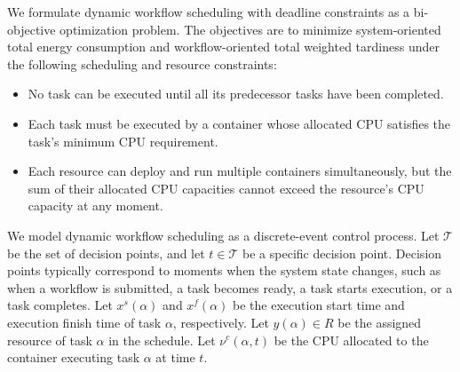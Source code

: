 \documentclass[10pt,journal]{IEEEtran}
\begin{document}
We formulate dynamic workflow scheduling with deadline constraints as a bi-objective optimization problem. The objectives are to minimize system-oriented total energy consumption and workflow-oriented total weighted tardiness under the following scheduling and resource constraints:
\begin{itemize}
    \item No task can be executed until all its predecessor tasks have been completed.
    \item Each task must be executed by a container whose allocated CPU satisfies the task's minimum CPU requirement.
    \item Each resource can deploy and run multiple containers simultaneously, but the sum of their allocated CPU capacities cannot exceed the resource's CPU capacity at any moment.
\end{itemize}

We model dynamic workflow scheduling as a discrete-event control process. Let $\mathcal{T}$ be the set of decision points, and let $t\in\mathcal{T}$ be a specific decision point. Decision points typically correspond to moments when the system state changes, such as when a workflow is submitted, a task becomes ready, a task starts execution, or a task completes. Let $x^s(\alpha)$ and $x^f(\alpha)$ be the execution start time and execution finish time of task $\alpha$, respectively. Let $y(\alpha)\in R$ be the assigned resource of task $\alpha$ in the schedule. Let $\nu^c(\alpha,t)$ be the CPU allocated to the container executing task $\alpha$ at time $t$.
\end{document}
